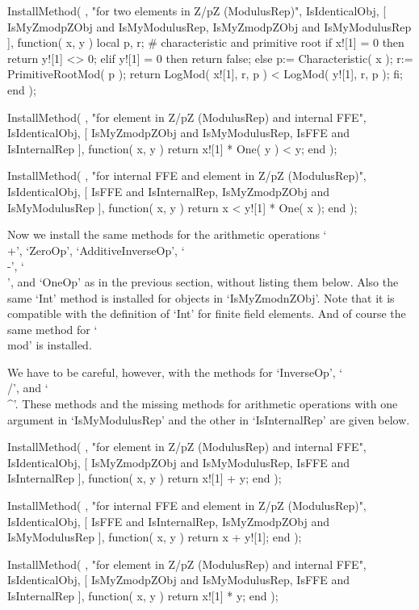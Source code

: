 InstallMethod( \<,
    "for two elements in Z/pZ (ModulusRep)",
    IsIdenticalObj,
    [ IsMyZmodpZObj and IsMyModulusRep,
      IsMyZmodpZObj and IsMyModulusRep ],
    function( x, y )
    local p, r;      # characteristic and primitive root
    if x![1] = 0 then
      return y![1] <> 0;
    elif y![1] = 0 then
      return false;
    else
      p:= Characteristic( x );
      r:= PrimitiveRootMod( p );
      return LogMod( x![1], r, p ) < LogMod( y![1], r, p );
    fi;
    end );

InstallMethod( \<,
    "for element in Z/pZ (ModulusRep) and internal FFE",
    IsIdenticalObj,
    [ IsMyZmodpZObj and IsMyModulusRep, IsFFE and IsInternalRep ],
    function( x, y )
    return x![1] * One( y ) < y;
    end );

InstallMethod( \<,
    "for internal FFE and element in Z/pZ (ModulusRep)",
    IsIdenticalObj,
    [ IsFFE and IsInternalRep, IsMyZmodpZObj and IsMyModulusRep ],
    function( x, y )
    return x < y![1] * One( x );
    end );
\endtt

Now we install the same methods for the arithmetic operations
`\\+', `ZeroOp', `AdditiveInverseOp', `\\-', `\\\*', and `OneOp'
as in the previous section, without listing them below.
Also the same `Int' method is installed for objects in `IsMyZmodnZObj'.
Note that it is compatible with the definition of `Int' for finite
field elements.
And of course the same method for `\\mod' is installed.

We have to be careful, however, with the methods for `InverseOp',
`\\/', and `\\^'.
These methods and the missing methods for arithmetic operations with
one argument in `IsMyModulusRep' and the other in `IsInternalRep'
are given below.

\begintt
InstallMethod( \+,
    "for element in Z/pZ (ModulusRep) and internal FFE",
    IsIdenticalObj,
    [ IsMyZmodpZObj and IsMyModulusRep, IsFFE and IsInternalRep ],
    function( x, y ) return x![1] + y; end );

InstallMethod( \+,
    "for internal FFE and element in Z/pZ (ModulusRep)",
    IsIdenticalObj,
    [ IsFFE and IsInternalRep, IsMyZmodpZObj and IsMyModulusRep ],
    function( x, y ) return x + y![1]; end );

InstallMethod( \*,
    "for element in Z/pZ (ModulusRep) and internal FFE",
    IsIdenticalObj,
    [ IsMyZmodpZObj and IsMyModulusRep, IsFFE and IsInternalRep ],
    function( x, y ) return x![1] * y; end );

